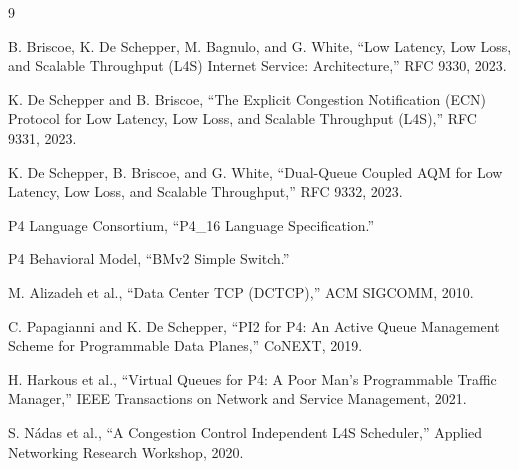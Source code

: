 \documentclass[10pt]{article}
\begin{document}
\begin{thebibliography}{9}

B. Briscoe, K. De Schepper, M. Bagnulo, and G. White,
``Low Latency, Low Loss, and Scalable Throughput (L4S) Internet Service: Architecture,''
RFC 9330, 2023.

K. De Schepper and B. Briscoe,
``The Explicit Congestion Notification (ECN) Protocol for Low Latency, Low Loss, and Scalable Throughput (L4S),''
RFC 9331, 2023.

K. De Schepper, B. Briscoe, and G. White,
``Dual-Queue Coupled AQM for Low Latency, Low Loss, and Scalable Throughput,''
RFC 9332, 2023.

P4 Language Consortium,
``P4\_16 Language Specification.''

P4 Behavioral Model,
``BMv2 Simple Switch.''

M. Alizadeh et al.,
``Data Center TCP (DCTCP),''
ACM SIGCOMM, 2010.

C. Papagianni and K. De Schepper,
``PI2 for P4: An Active Queue Management Scheme for Programmable Data Planes,''
CoNEXT, 2019.

H. Harkous et al.,
``Virtual Queues for P4: A Poor Man's Programmable Traffic Manager,''
IEEE Transactions on Network and Service Management, 2021.

S. Nádas et al.,
``A Congestion Control Independent L4S Scheduler,''
Applied Networking Research Workshop, 2020.

\end{thebibliography}
\end{document}
